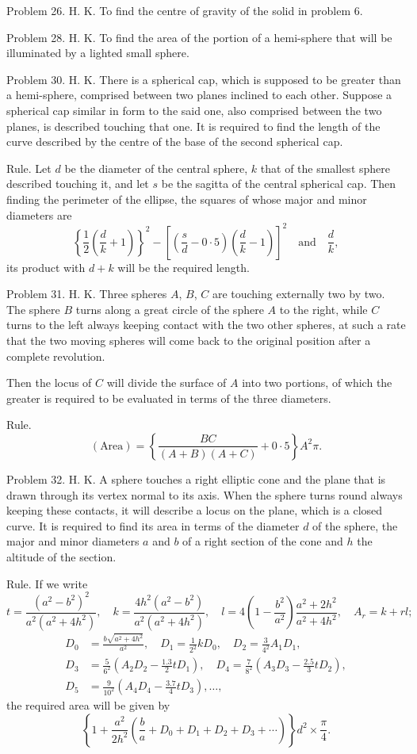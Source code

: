 \documentclass[11pt]{article}
\newcommand{\scanpage}[2]{\clearpage\setcounter{footnote}{0}\noindent{\footnotesize\color{gray}PDF page #1 · #2}\par\medskip}
\begin{document}
Problem 26. H. K. To find the centre of gravity of the solid in problem 6.

Problem 28. H. K. To find the area of the portion of a hemi-sphere that will be illuminated by a lighted small sphere.

Problem 30. H. K. There is a spherical cap, which is supposed to be greater than a hemi-sphere, comprised between two planes inclined to each other. Suppose a spherical cap similar in form to the said one, also comprised between the two planes, is described touching that one. It is required to find the length of the curve described by the centre of the base of the second spherical cap.

Rule. Let $d$ be the diameter of the central sphere, $k$ that of the smallest sphere described touching it, and let $s$ be the sagitta of the central spherical cap. Then finding the perimeter of the ellipse, the squares of whose major and minor diameters are
\[
\left\{\frac{1}{2}\left(\frac{d}{k}+1\right)\right\}^{2} - \left[\left(\frac{s}{d}-0{\cdot}5\right)\left(\frac{d}{k}-1\right)\right]^{2} \quad\text{and}\quad \frac{d}{k},
\]
its product with $d + k$ will be the required length.

Problem 31. H. K. Three spheres $A$, $B$, $C$ are touching externally two by two. The sphere $B$ turns along a great circle of the sphere $A$ to the right, while $C$ turns to the left always keeping contact with the two other spheres, at such a rate that the two moving spheres will come back to the original position after a complete revolution.

\scanpage{0320}{printed page 306}
\noindent Then the locus of $C$ will divide the surface of $A$ into two portions, of which the greater is required to be evaluated in terms of the three diameters.

Rule.
\[
(\text{Area}) = \left\{\frac{BC}{(A+B)(A+C)}+0{\cdot}5\right\}A^2\pi.
\]

Problem 32. H. K. A sphere touches a right elliptic cone and the plane that is drawn through its vertex normal to its axis. When the sphere turns round always keeping these contacts, it will describe a locus on the plane, which is a closed curve. It is required to find its area in terms of the diameter $d$ of the sphere, the major and minor diameters $a$ and $b$ of a right section of the cone and $h$ the altitude of the section.

Rule. If we write
\[
t=\frac{(a^2-b^2)^2}{a^2(a^2+4h^2)},\quad k=\frac{4h^2(a^2-b^2)}{a^2(a^2\text{}+4h^2)},\quad l=4\left(1-\frac{b^2}{a^2}\right)\frac{a^2+2h^2}{a^2+4h^2},\quad A_r=k+rl;
\]
\begin{align*}
D_0&=\frac{b\sqrt{a^2+4h^2}}{a^2},\quad D_1=\frac{1}{2^2}kD_0,\quad D_2=\frac{3}{4^2}A_1D_1,\\
D_3&=\frac{5}{6^2}\left(A_2D_2-\frac{1.3}{2}tD_1\right),\quad D_4=\frac{7}{8^2}\left(A_3D_3-\frac{2.5}{3}tD_2\right),\\
D_5&=\frac{9}{10^2}\left(A_4D_4-\frac{3.7}{4}tD_3\right),\ldots,
\end{align*}
\noindent the required area will be given by
\[
\left\{1+\frac{a^2}{2h^2}\left(\frac{b}{a}+D_0+D_1+D_2+D_3+\cdots\right)\right\}d^2\times\frac{\pi}{4}.
\]
\end{document}
